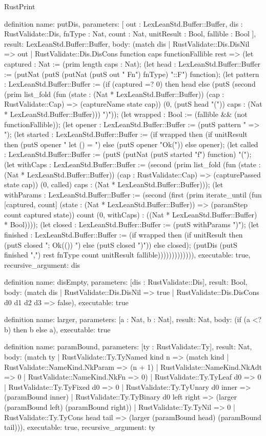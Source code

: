 \begin{lexlean}{RustPrint}
\begin{semanticmodule}
definition{
  name: putDis,
  parameters: [
    out : LexLeanStd.Buffer::Buffer,
    dis : RustValidate::Dis,
    fnType : Nat,
    count : Nat,
    unitResult : Bool,
    fallible : Bool
  ],
  result: LexLeanStd.Buffer::Buffer,
  body: (match dis
    | RustValidate::Dis.DisNil => out
    | RustValidate::Dis.DisCons function caps functionFallible rest => (let captured : Nat := (prim length caps : Nat); (let head : LexLeanStd.Buffer::Buffer := (putNat (putS (putNat (putS out "            Fn") fnType) "::F") function); (let pattern : LexLeanStd.Buffer::Buffer := (if (captured =? 0) then head else (putS (second (prim list_fold (fun (state : (Nat * LexLeanStd.Buffer::Buffer)) (cap : RustValidate::Cap) => (captureName state cap)) (0, (putS head "(")) caps : (Nat * LexLeanStd.Buffer::Buffer))) ")")); (let wrapped : Bool := (fallible && (not functionFallible)); (let opener : LexLeanStd.Buffer::Buffer := (putS pattern " => "); (let started : LexLeanStd.Buffer::Buffer := (if wrapped then (if unitResult then (putS opener "{ let () = ") else (putS opener "Ok(")) else opener); (let called : LexLeanStd.Buffer::Buffer := (putS (putNat (putS started "f") function) "("); (let withCaps : LexLeanStd.Buffer::Buffer := (second (prim list_fold (fun (state : (Nat * LexLeanStd.Buffer::Buffer)) (cap : RustValidate::Cap) => (capturePassed state cap)) (0, called) caps : (Nat * LexLeanStd.Buffer::Buffer))); (let withParams : LexLeanStd.Buffer::Buffer := (second (first (prim iterate_until (fun [captured, count] (state : (Nat * LexLeanStd.Buffer::Buffer)) => (paramStep count captured state)) count (0, withCaps) : ((Nat * LexLeanStd.Buffer::Buffer) * Bool)))); (let closed : LexLeanStd.Buffer::Buffer := (putS withParams ")"); (let finished : LexLeanStd.Buffer::Buffer := (if wrapped then (if unitResult then (putS closed "; Ok(()) }") else (putS closed ")")) else closed); (putDis (putS finished ",\n") rest fnType count unitResult fallible))))))))))))),
  executable: true,
  recursive_argument: dis
}

definition{
  name: disEmpty,
  parameters: [dis : RustValidate::Dis],
  result: Bool,
  body: (match dis
    | RustValidate::Dis.DisNil => true
    | RustValidate::Dis.DisCons d0 d1 d2 d3 => false),
  executable: true
}

definition{
  name: larger,
  parameters: [a : Nat, b : Nat],
  result: Nat,
  body: (if (a <? b) then b else a),
  executable: true
}

definition{
  name: paramBound,
  parameters: [ty : RustValidate::Ty],
  result: Nat,
  body: (match ty
    | RustValidate::Ty.TyNamed kind n => (match kind
      | RustValidate::NameKind.NkParam => (n + 1)
      | RustValidate::NameKind.NkAdt => 0
      | RustValidate::NameKind.NkFn => 0)
    | RustValidate::Ty.TyLeaf d0 => 0
    | RustValidate::Ty.TyFixed d0 => 0
    | RustValidate::Ty.TyUnary d0 inner => (paramBound inner)
    | RustValidate::Ty.TyBinary d0 left right => (larger (paramBound left) (paramBound right))
    | RustValidate::Ty.TyNil => 0
    | RustValidate::Ty.TyCons head tail => (larger (paramBound head) (paramBound tail))),
  executable: true,
  recursive_argument: ty
}


\end{semanticmodule}
\end{lexlean}
